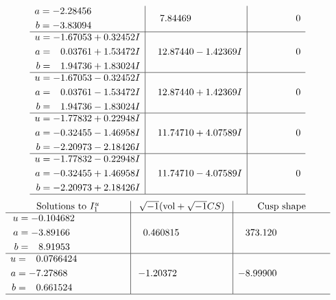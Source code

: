 \documentclass[1p]{elsarticle_modified}
\theoremstyle{definition}
\newcommand{\I}{\sqrt{-1}}
\begin{document}
$$\begin{array}{c|c|c}
\begin{aligned}
a &= -2.28456\phantom{ +0.000000I} \\
b &= -3.83094\phantom{ +0.000000I}\end{aligned}
 & \phantom{-}7.84469\phantom{ +0.000000I} & \phantom{-0.000000 } 0 \\ \hline\begin{aligned}
u &= -1.67053 + 0.32452 I \\
a &= \phantom{-}0.03761 + 1.53472 I \\
b &= \phantom{-}1.94736 + 1.83024 I\end{aligned}
 & \phantom{-}12.87440 - 1.42369 I & \phantom{-0.000000 } 0 \\ \hline\begin{aligned}
u &= -1.67053 - 0.32452 I \\
a &= \phantom{-}0.03761 - 1.53472 I \\
b &= \phantom{-}1.94736 - 1.83024 I\end{aligned}
 & \phantom{-}12.87440 + 1.42369 I & \phantom{-0.000000 } 0 \\ \hline\begin{aligned}
u &= -1.77832 + 0.22948 I \\
a &= -0.32455 - 1.46958 I \\
b &= -2.20973 - 2.18426 I\end{aligned}
 & \phantom{-}11.74710 + 4.07589 I & \phantom{-0.000000 } 0 \\ \hline\begin{aligned}
u &= -1.77832 - 0.22948 I \\
a &= -0.32455 + 1.46958 I \\
b &= -2.20973 + 2.18426 I\end{aligned}
 & \phantom{-}11.74710 - 4.07589 I & \phantom{-0.000000 } 0\\
 \hline 
 \end{array}$$\newpage$$\begin{array}{c|c|c}  
\text{Solutions to }I^u_{1}& \I (\text{vol} + \sqrt{-1}CS) & \text{Cusp shape}\\
 \hline 
\begin{aligned}
u &= -0.104682\phantom{ +0.000000I} \\
a &= -3.89166\phantom{ +0.000000I} \\
b &= \phantom{-}8.91953\phantom{ +0.000000I}\end{aligned}
 & \phantom{-}0.460815\phantom{ +0.000000I} & \phantom{-}373.120\phantom{ +0.000000I} \\ \hline\begin{aligned}
u &= \phantom{-}0.0766424\phantom{ +0.000000I} \\
a &= -7.27868\phantom{ +0.000000I} \\
b &= \phantom{-}0.661524\phantom{ +0.000000I}\end{aligned}
 & -1.20372\phantom{ +0.000000I} & -8.99900\phantom{ +0.000000I}\\
 \hline 
 \end{array}$$\newpage\newpage\renewcommand{\arraystretch}{1}
\end{document}
